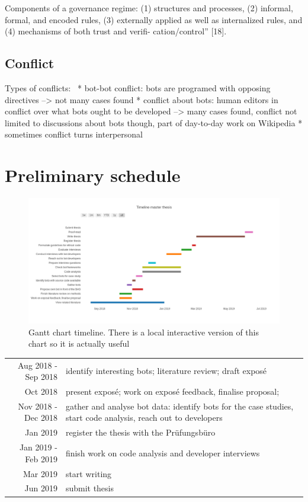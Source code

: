 \documentclass[pdftex,a4paper,11pt]{scrartcl}
\begin{document}
Components of a governance regime:
(1) structures and processes, (2)
informal, formal, and encoded rules, (3) externally applied as well
as internalized rules, and (4) mechanisms of both trust and verifi-
cation/control” [18].

\subsection{Conflict}
Types of conflicts:~\cite{GeiHal2017}
* bot-bot conflict: bots are programed with opposing directives --> not many cases found
* conflict about bots: human editors in conflict over what bots ought to be developed --> many cases found, conflict not limited to discussions about bots though, part of day-to-day work on Wikipedia
* sometimes conflict turns interpersonal

\section{Preliminary schedule}

\begin{figure}[!h]
	\centering
		\includegraphics[width=1\textwidth]{../charts/gantt-thesis.png}
    \caption{Gantt chart timeline. There is a local interactive version of this chart so it is actually useful}
\end{figure}

\begin{tabular}{r p{11cm}}
    Aug 2018 - Sep 2018 & identify interesting bots; literature review; draft exposé \\
           Oct 2018 & present exposé; work on exposé feedback, finalise proposal;\\
    Nov 2018 - Dec 2018 & gather and analyse bot data: identify bots for the case studies, start code analysis, reach out to developers \\
           Jan 2019 & register the thesis with the Prüfungsbüro \\
Jan 2019 - Feb 2019 & finish work on code analysis and developer interviews \\
           Mar 2019 & start writing \\
           Jun 2019 & submit thesis \\
\end{tabular}
\end{document}

